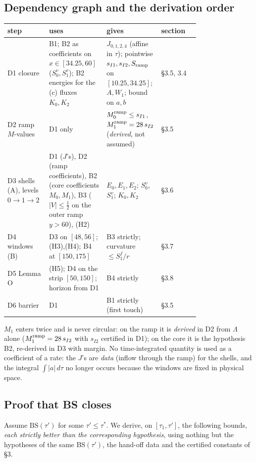 \documentclass[11pt]{article}
\theoremstyle{definition}
\theoremstyle{remark}
\begin{document}
\subsection{Dependency graph and the derivation order}
\begin{center}\small\begin{tabular}{@{}l p{0.30\linewidth} p{0.27\linewidth} p{0.2\linewidth}@{}}\toprule
step & uses & gives & section\\\midrule
D1 closure & B1; B2 as coefficients on $x\in[34.25,60]$ ($S_0^v,S_1^v$); B2 energies for the (c) fluxes $K_0,K_2$ & $J_{0,1,2,4}$ (affine in $\tau$); pointwise $s_{I1},s_{I2},S_{\rm ramp}$ on $[10.25,34.25]$; $A,W_1$; bound on $a,b$ & \S3.5, 3.4\\
D2 ramp $M$-values & D1 only & $M_0^{\rm ramp}\le s_{I1}$, $M_1^{\rm ramp}=28\,s_{I2}$ (\emph{derived}, not assumed) & \S3.5\\
D3 shells (A), levels $0\to1\to2$ & D1 ($J$'s), D2 (ramp coefficients), B2 (core coefficients $M_0,M_1$), B3 ($|V|\le\tfrac12$ on the outer ramp $y>60$), (H2) & $E_0,E_1,E_2$; $S_0^v$, $S_1^v$; $K_0,K_2$ & \S3.6\\
D4 windows (B) & D3 on $[48,56]$; (H3),(H4); B4 at $[150,175]$ & B3 strictly; curvature $\le S_1^f/r$ & \S3.7\\
D5 Lemma O & (H5); D4 on the strip $[50,150]$; horizon from D1 & B4 strictly & \S3.8\\
D6 barrier & D1 & B1 strictly (first touch) & \S3.5\\\bottomrule
\end{tabular}\end{center}
$M_1$ enters twice and is never circular: on the ramp it is \emph{derived} in D2 from $\Lambda$ alone ($M_1^{\rm ramp}=28\,s_{I2}$ with $s_{I2}$ certified in D1); on the core it is the hypothesis B2, re-derived in D3 with margin. No time-integrated quantity is used as a coefficient of a rate: the $J$'s are \emph{data} (inflow through the ramp) for the shells, and the integral $\int|a|\,d\tau$ no longer occurs because the windows are fixed in physical space.

\subsection{Proof that BS closes}
Assume $\mathrm{BS}(\tau')$ for some $\tau'\le\tau^\ast$. We derive, on $[\tau_1,\tau']$, the following bounds, \emph{each strictly better than the corresponding hypothesis}, using nothing but the hypotheses of the same $\mathrm{BS}(\tau')$, the hand-off data and the certified constants of \S3.
\end{document}
